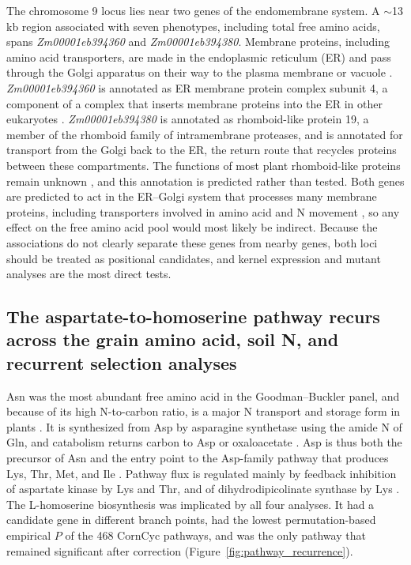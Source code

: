 \documentclass[namedate,unnumsec,webpdf,contemporary,large]{oup-authoring-template}
\begin{document}
The chromosome 9 locus lies near two genes of the endomembrane system. A $\sim$13 kb region associated with seven phenotypes, including total free amino acids, spans \textit{Zm00001eb394360} and \textit{Zm00001eb394380}. Membrane proteins, including amino acid transporters, are made in the endoplasmic reticulum (ER) and pass through the Golgi apparatus on their way to the plasma membrane or vacuole \citep{Brandizzi2018ERGolgi}. \textit{Zm00001eb394360} is annotated as ER membrane protein complex subunit 4, a component of a complex that inserts membrane proteins into the ER in other eukaryotes \citep{Guna2018EMC}. \textit{Zm00001eb394380} is annotated as rhomboid-like protein 19, a member of the rhomboid family of intramembrane proteases, and is annotated for transport from the Golgi back to the ER, the return route that recycles proteins between these compartments. The functions of most plant rhomboid-like proteins remain unknown \citep{Lavell2021RBL10}, and this annotation is predicted rather than tested. Both genes are predicted to act in the ER--Golgi system that processes many membrane proteins, including transporters involved in amino acid and N movement \citep{Brandizzi2018ERGolgi}, so any effect on the free amino acid pool would most likely be indirect. Because the associations do not clearly separate these genes from nearby genes, both loci should be treated as positional candidates, and kernel expression and mutant analyses are the most direct tests.

\subsection{The aspartate-to-homoserine pathway recurs across the grain amino acid, soil N, and recurrent selection analyses}

Asn was the most abundant free amino acid in the Goodman--Buckler panel, and because of its high N-to-carbon ratio, is a major N transport and storage form in plants \citep{Lea2007Asparagine}. It is synthesized from Asp by asparagine synthetase using the amide N of Gln, and catabolism returns carbon to Asp or oxaloacetate \citep{Lea2007Asparagine}. Asp is thus both the precursor of Asn and the entry point to the Asp-family pathway that produces Lys, Thr, Met, and Ile \citep{Han2021Aspartate, Wang2018AspSeeds, Viola2001AspartatePathway}. Pathway flux is regulated mainly by feedback inhibition of aspartate kinase by Lys and Thr, and of dihydrodipicolinate synthase by Lys \citep{Azevedo2006AspPathway, Jander2009AspArabidopsis}. The L-homoserine biosynthesis was implicated by all four analyses. It had a candidate gene in different branch points, had the lowest permutation-based empirical $P$ of the 468 CornCyc pathways, and was the only pathway that remained significant after correction (Figure~\ref{fig:pathway_recurrence}).
\end{document}
